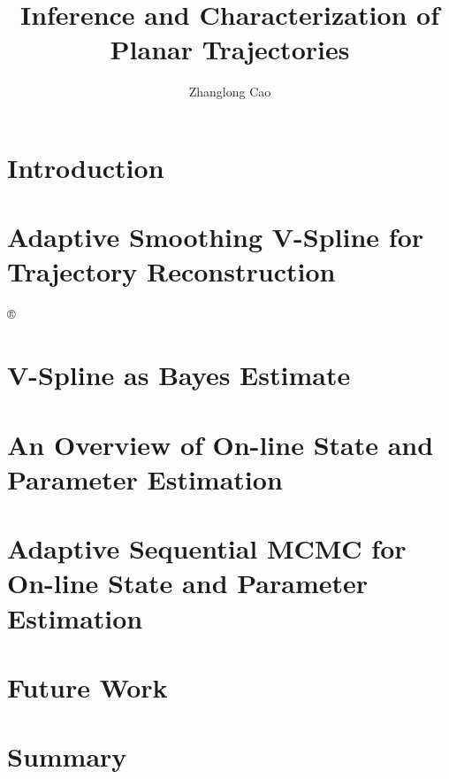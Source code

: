 \documentclass[12pt,twoside]{report}
\title{Inference and Characterization of Planar Trajectories}
\author{Zhanglong Cao}
\date{}
\begin{document}
\frontstuff

\linespread{1.3} \normalsize


\chapter{Introduction}\label{ChapterIntro}

\clearemptydoublepage

\chapter{Adaptive Smoothing V-Spline for Trajectory Reconstruction}\label{ChapterTS}


®
\clearemptydoublepage

\chapter{V-Spline as Bayes Estimate}\label{ChapterGPR}

\clearemptydoublepage

\chapter{An Overview of On-line State and Parameter Estimation}\label{ChapterFR}

\clearemptydoublepage

\chapter{Adaptive Sequential MCMC for On-line State and Parameter Estimation}\label{ChapterMCMC}

\clearemptydoublepage


\chapter{Future Work}\label{ChapterFuture}

\clearemptydoublepage


\chapter{Summary}\label{ChapterSummary}

\clearemptydoublepage


\end{document}
